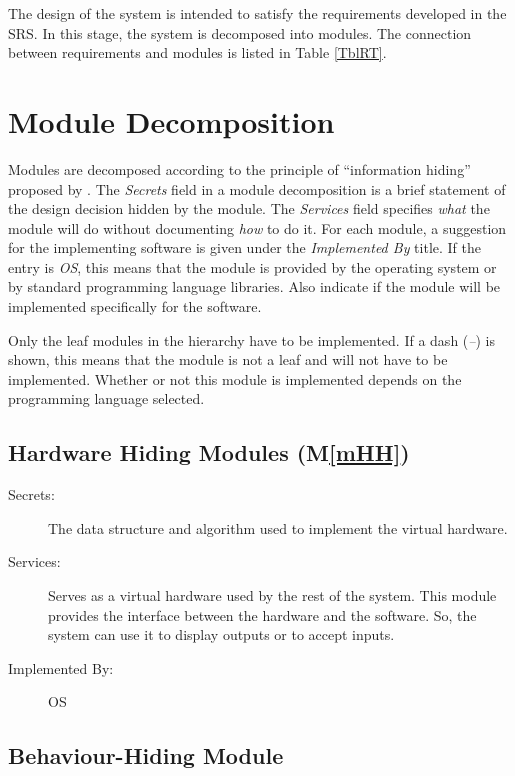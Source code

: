 \documentclass[12pt, titlepage]{article}
\newcommand{\mref}[1]{M\ref{#1}}
\begin{document}
The design of the system is intended to satisfy the requirements developed in
the SRS. In this stage, the system is decomposed into modules. The connection
between requirements and modules is listed in Table \ref{TblRT}.

\section{Module Decomposition} \label{SecMD}

Modules are decomposed according to the principle of ``information hiding''
proposed by \cite{parnas_modular_1985}. The \emph{Secrets} field in a module
decomposition is a brief statement of the design decision hidden by the
module. The \emph{Services} field specifies \emph{what} the module will do
without documenting \emph{how} to do it. For each module, a suggestion for the
implementing software is given under the \emph{Implemented By} title. If the
entry is \emph{OS}, this means that the module is provided by the operating
system or by standard programming language libraries.  Also indicate if the
module will be implemented specifically for the software.

Only the leaf modules in the
hierarchy have to be implemented. If a dash (\emph{--}) is shown, this means
that the module is not a leaf and will not have to be implemented. Whether or
not this module is implemented depends on the programming language
selected.

\subsection{Hardware Hiding Modules (\mref{mHH})}

\begin{description}
\item[Secrets:]The data structure and algorithm used to implement the virtual
  hardware.
\item[Services:]Serves as a virtual hardware used by the rest of the
  system. This module provides the interface between the hardware and the
  software. So, the system can use it to display outputs or to accept inputs.
\item[Implemented By:] OS
\end{description}

\subsection{Behaviour-Hiding Module}
\end{document}
